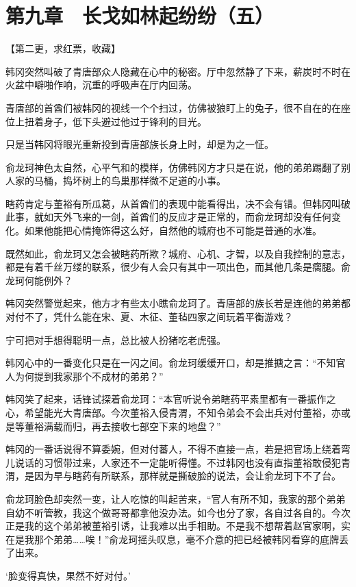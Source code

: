 \section{第九章　长戈如林起纷纷（五）}

【第二更，求红票，收藏】

韩冈突然叫破了青唐部众人隐藏在心中的秘密。厅中忽然静了下来，薪炭时不时在火盆中噼啪作响，沉重的呼吸声在厅内回荡。

青唐部的首酋们被韩冈的视线一个个扫过，仿佛被狼盯上的兔子，很不自在的在座位上扭着身子，低下头避过他过于锋利的目光。

只是当韩冈将眼光重新投到青唐部族长身上时，却是为之一怔。

俞龙珂神色太自然，心平气和的模样，仿佛韩冈方才只是在说，他的弟弟踢翻了别人家的马桶，捣坏树上的鸟巢那样微不足道的小事。

瞎药肯定与董裕有所瓜葛，从首酋们的表现中能看得出，决不会有错。但韩冈叫破此事，就如天外飞来的一剑，首酋们的反应才是正常的，而俞龙珂却没有任何变化。如果他能把心情掩饰得这么好，自然他的城府也不可能是普通的水准。

既然如此，俞龙珂又怎会被瞎药所欺？城府、心机、才智，以及自我控制的意志，都是有着千丝万缕的联系，很少有人会只有其中一项出色，而其他几条是瘸腿。俞龙珂何能例外？

韩冈突然警觉起来，他方才有些太小瞧俞龙珂了。青唐部的族长若是连他的弟弟都对付不了，凭什么能在宋、夏、木征、董毡四家之间玩着平衡游戏？

宁可把对手想得聪明一点，总比被人扮猪吃老虎强。

韩冈心中的一番变化只是在一闪之间。俞龙珂缓缓开口，却是推搪之言：“不知官人为何提到我家那个不成材的弟弟？”

韩冈笑了起来，话锋试探着俞龙珂：“本官听说令弟瞎药平素里都有一番振作之心，希望能光大青唐部。今次董裕入侵青渭，不知令弟会不会出兵对付董裕，亦或是等董裕满载而归，再去接收七部空下来的地盘？”

韩冈的一番话说得不算委婉，但对付蕃人，不得不直接一点，若是把官场上绕着弯儿说话的习惯带过来，人家还不一定能听得懂。不过韩冈也没有直指董裕敢侵犯青渭，是因为早与瞎药有所联系，那样就是撕破脸的说法，会让俞龙珂下不了台。

俞龙珂脸色却突然一变，让人吃惊的叫起苦来，“官人有所不知，我家的那个弟弟自幼不听管教，我这个做哥哥都拿他没办法。如今也分了家，各自过各自的。今次正是我的这个弟弟被董裕引诱，让我难以出手相助。不是我不想帮着赵官家啊，实在是我那个弟弟……唉！”俞龙珂摇头叹息，毫不介意的把已经被韩冈看穿的底牌丢了出来。

‘脸变得真快，果然不好对付。’

